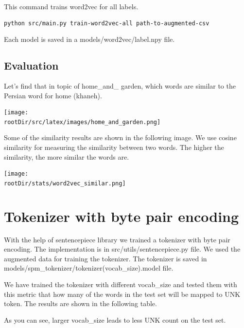 \documentclass[12pt, letterpaper]{article}
\def\rootDir{../..}
\begin{document}
    This command trains word2vec for all labels.
    \begin{lstlisting}[language=bash]
    python src/main.py train-word2vec-all path-to-augmented-csv
    \end{lstlisting}
    Each model is saved in a models\slash word2vec\slash label.npy file.

    \subsection{Evaluation}\label{subsec:evaluation}
    Let's find that in topic of home\_and\_ garden, which words are similar to the Persian word for home (khaneh).
    \begin{center}
        \texttt{[image: \\rootDir/src/latex/images/home\_and\_garden.png]}
    \end{center}

    Some of the similarity results are shown in the following image. We use cosine similarity for measuring the similarity between two words. The higher the similarity, the more similar the words are.
    \begin{center}
        \texttt{[image: \\rootDir/stats/word2vec\_similar.png]}
    \end{center}

    \section{Tokenizer with byte pair encoding}\label{sec:tokenizer-with-byte-pair-encoding}
    With the help of sentencepiece library we trained a tokenizer with byte pair encoding. The implementation is in src\slash utils\slash sentencepiece.py file. We used the augmented data for training the tokenizer. The tokenizer is saved in models\slash spm\_tokenizer\slash tokenizer(vocab\_size).model file.
    
    We have trained the tokenizer with different vocab\_size and tested them with this metric that how many of the words in the test set will be mapped to UNK token. The results are shown in the following table.
    \begin{center}
        \csvreader[tabular=|c|c|,
        table head=\hline vocab\_size & UNK count\\ \hline,
        late after line=\\ \hline
        ]{\rootDir/stats/tokenizer_stats.csv}{}{
            \csvcoli & \csvcolii
        }
    \end{center}
    As you can see, larger vocab\_size leads to less UNK count on the test set.
\end{document}
